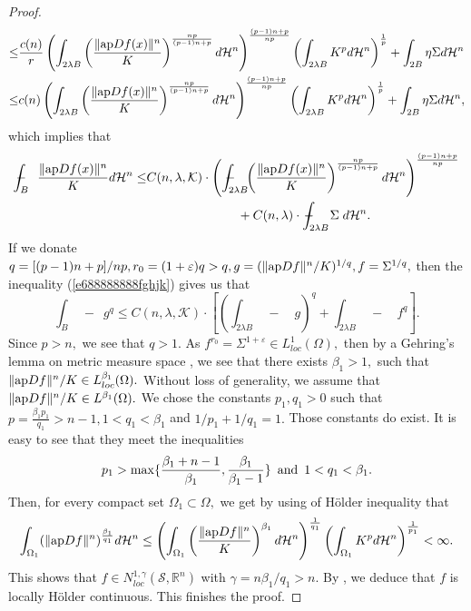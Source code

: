 \documentclass[11pt,twoside]{article}
\theoremstyle{definition}
\theoremstyle{remark}
\begin{document}
\begin{proof}
\begin{equation}
\begin{aligned}
\leq& \frac{c(n)}{r}\left(\int_{ 2\lambda B}\left(\frac{\| {\rm ap}Df(x)\|^{n}}{K}\right)^{\frac{np}{(p-1)n+p}}d\mathcal{H}^{n}\right)^{\frac{(p-1)n+p}{np}}\left(\int_{ 2\lambda B}K^{p}d\mathcal{H}^{n}\right)^{\frac{1}{p}}+\int_{2B }\eta \Sigma d\mathcal{H}^{n}\\
\leq& c(n)\left(\int_{ 2\lambda B}\left(\frac{\| {\rm ap}Df(x)\|^{n}}{K}\right)^{\frac{np}{(p-1)n+p}}d\mathcal{H}^{n}\right)^{\frac{(p-1)n+p}{np}}\left(\int_{ 2\lambda B}K^{p}d\mathcal{H}^{n}\right)^{\frac{1}{p}}+\int_{2B }\eta \Sigma d\mathcal{H}^{n},
\end{aligned}
\end{equation}
which implies that 
\begin{equation}\label{e688888888fghjk}
\begin{aligned}
\int_{ B}\!\!\!\!\!\!\!\!\!\!\; {}-{} \,\,\,\, \frac{\| {\rm ap}Df(x)\|^{n}}{K}d\mathcal{H}^{n}\leq& C(n,\lambda,\mathcal{K})\cdot\left(\int_{ 2\lambda B}\!\!\!\!\!\!\!\!\!\!\!\!\!\!\!\; {}-{} \,\,\,\left(\frac{\| {\rm ap}Df(x)\|^{n}}{K}\right)^{\frac{np}{(p-1)n+p}}d\mathcal{H}^{n}\right)^{\frac{(p-1)n+p}{np}}\\
&\,\,\,\,\,\,\,\,\,\,\,\,\,\,\,\,\,\,\,\,\,\,\,\,\,\,\,\,\,\,\,\,\,\,\,\,\,\,\,\,\,\,\,
+C(n,\lambda)\cdot \int_{ 2\lambda B}\!\!\!\!\!\!\!\!\!\!\!\!\!\!\!\!\; {}-{} \,\,\,\;\;\Sigma \;d\mathcal{H}^{n}.\\
\end{aligned}
\end{equation}
If we donate $q=[(p-1)n+p]/np, r_{0}=(1+\varepsilon)q>q, g=(\| {\rm ap}Df\|^{n}/K)^{1/q}, f=\Sigma^{1/q},$ then the inequality (\ref{e688888888fghjk}) gives us that
$$\int_{ B}\!\!\!\!\!\!\!\!\!\!\!\; {}-{} \,\,\, g^{q}\leq C(n,\lambda,\mathcal{K})\cdot\left[\left(\int_{2\lambda B}\!\!\!\!\!\!\!\!\!\!\!\!\!\!\!\!\; {}-{} \,\,\,\,\,\,g\right)^{q}
+ \int_{ 2\lambda B}\!\!\!\!\!\!\!\!\!\!\!\!\!\!\!\!\; {}-{} \,\,\,\,\;f^{q}\right].$$
Since $p>n,$ we see that $q>1.$ As $f^{r_{0}}=\Sigma^{1+\varepsilon}\in L_{loc}^{1}(\Omega),$ then by a Gehring's lemma on metric measure space \cite[Theorem 3.3]{Gol05}, we see that   there exists $\beta_{1}>1,$ such that $\| {\rm ap}Df\|^{n}/K\in L_{loc}^{\beta_{1}}(\Omega).$ Without loss of generality, we assume that $\| {\rm ap}Df\|^{n}/K\in L^{\beta_{1}}(\Omega).$ We chose the constants $p_{1},q_{1}>0$ such that 
$p=\frac{\beta_{1}p_{1}}{q_{1}}>n-1,1<q_{1}<\beta_{1}$ and $1/p_{1}+1/q_{1}=1.$ Those constants do exist. It is easy to see that they meet the inequalities 
$$p_{1}>\max\{\frac{\beta_{1}+n-1}{\beta_{1}},\frac{\beta_{1}}{\beta_{1}-1}\}\,\,\,{\rm and }\,\,\,1<q_{1}<\beta_{1}.$$
Then, for every compact set $\Omega_{1}\subset\Omega,$
we get by using of H\"{o}lder inequality that
$$\int_{\Omega_{1}}(\| {\rm ap}Df\|^{n})^{\frac{\beta_{1}}{q_{1}}}d\mathcal{H}^{n}
\leq\left(\int_{\Omega_{1}}\left(\frac{\| {\rm ap}Df\|^{n}}{K}\right)^{\beta_{1}}d\mathcal{H}^{n}\right)^{\frac{1}{q_{1}}}\left(\int_{\Omega_{1}}K^{p}d\mathcal{H}^{n}\right)^{\frac{1}{p_{1}}}<\infty.$$
This shows that $f\in N_{loc}^{1,\gamma}(\mathcal{S},\mathbb{R}^{n})$ with $\gamma=n\beta_{1}/q_{1}>n.$ By \cite[Theorem 5.1]{HK00}, we deduce that $f$ is locally H\"{o}lder continuous.
This finishes the proof.
\end{proof}
\end{document}
